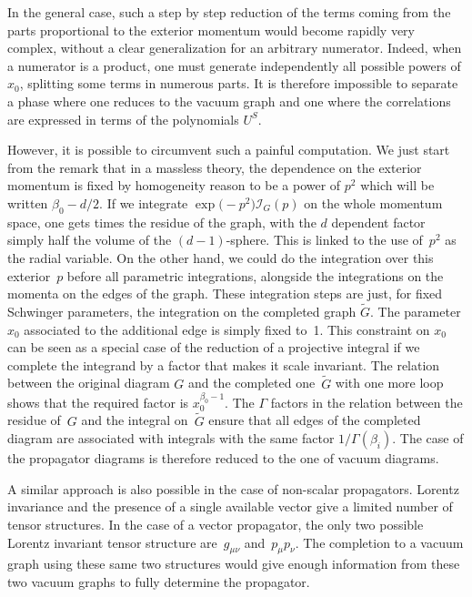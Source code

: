 \documentclass[pdftex]{sigma}
\numberwithin{equation}{section}
\def\cI{{\mathcal I}}
\begin{document}
In the general case, such a step by step reduction of the terms coming from the parts proportional to the
exterior momentum would become rapidly very complex, without a clear generalization for an arbitrary
numerator. Indeed, when a numerator is a product, one must generate independently all possible powers of
$x_0$, splitting some terms in numerous parts. It is therefore impossible to separate a phase where one
reduces to the vacuum graph and one where the correlations are expressed in terms of the polynomials $U^S$.

However, it is possible to circumvent such a painful computation. We just start from the remark that
in a massless theory, the dependence on the exterior momentum is fixed by homogeneity reason to be a
power of $p^2$ which will be written $\beta_0 - d/2$. If we integrate $\exp\bigl(-p^2\bigr) \cI_G(p)$ on the
whole momentum space, one gets  times the residue of the
graph, with the $d$ dependent factor simply half the volume of the $(d-1)$-sphere. This is linked to the use of~$p^2$ as the radial variable.
On the other hand, we could do the integration over this exterior~$p$ before all parametric
integrations, alongside the integrations on the momenta on the edges of the graph. These integration steps are just, for fixed Schwinger
parameters, the integration on the
completed graph $\tilde G$.
The parameter $x_0$ associated to the additional edge is simply fixed to~1. This constraint on $x_0$ can be
seen as a special case of the reduction of a projective integral if we complete the integrand
by a factor that makes it scale invariant. The relation between the original diagram $G$ and the completed one~$\tilde
G$ with one more loop shows that the required factor is $x_0^{\beta_0-1}$. The $\Gamma$ factors in the relation
between the residue of~$G$ and the integral on~$\tilde G$ ensure that all edges of the completed diagram are associated
with integrals with the same factor $1/\Gamma(\beta_i)$. The case of the propagator
diagrams is therefore reduced to the one of vacuum diagrams.

A similar approach is also possible in the case of non-scalar propagators. Lorentz invariance and
the presence of a single available vector give a limited number of tensor structures. In the case of a vector propagator, the only two possible
Lorentz invariant tensor structure are~$g_{\mu\nu}$ and~$p_\mu p_\nu$. The completion to a vacuum graph using these same two structures
would give enough information from these two vacuum graphs to fully determine the propagator.
\end{document}
